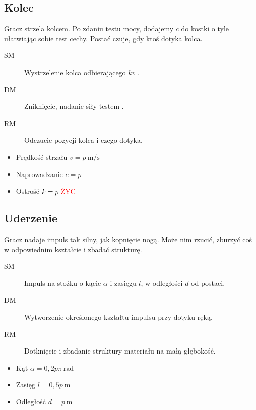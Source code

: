 \subsection{Kolec}
Gracz strzela kolcem.
Po zdaniu testu mocy, dodajemy $c$ do kostki o tyle ułatwiając sobie test cechy.
Postać czuje, gdy ktoś dotyka kolca.
\begin{description}
	\item[SM] Wystrzelenie kolca odbierającego $kv$ \abzyc{}.
	\item[DM] Zniknięcie, nadanie siły testem \abs{}.
	\item[RM] Odczucie pozycji kolca i czego dotyka.
\end{description}
\begin{itemize}
	\item Prędkość strzału $v = p \ \si{\metre\per\second}$
	\item Naprowadzanie $c = p$
	\item Ostrość $k = p \ \text{\abzyc{}}$
\end{itemize}

\subsection{Uderzenie}
Gracz nadaje impuls tak silny, jak kopnięcie nogą.
Może nim rzucić, zburzyć coś w odpowiednim kształcie i zbadać strukturę.
\begin{description}
	\item[SM] Impuls na stożku o kącie $\alpha$ i zasięgu $l$, w odległości $d$ od postaci.
	\item[DM] Wytworzenie określonego kształtu impulsu przy dotyku ręką.
	\item[RM] Dotknięcie i zbadanie struktury materiału na małą głębokość.
\end{description}
\begin{itemize}
	\item Kąt $\alpha = 0,2p\pi \ \si{\radian}$
	\item Zasięg $l = 0,5p \ \si{\meter}$
	\item Odległość $d = p \ \si{\meter}$
\end{itemize}

